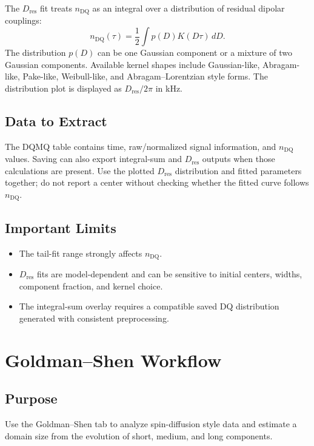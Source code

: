 \documentclass[11pt,a4paper]{article}
\newcommand{\Dres}{\ensuremath{D_{\mathrm{res}}}}
\newcommand{\nDQ}{\ensuremath{n_{\mathrm{DQ}}}}
\begin{document}
The \Dres{} fit treats \nDQ{} as an integral over a distribution of residual dipolar couplings:
\begin{equation}
\nDQ(\tau)=\frac{1}{2}\int p(D)K(D\tau)\,dD.
\end{equation}
The distribution \(p(D)\) can be one Gaussian component or a mixture of two Gaussian components. Available kernel shapes include Gaussian-like, Abragam-like, Pake-like, Weibull-like, and Abragam--Lorentzian style forms. The distribution plot is displayed as \(\Dres/2\pi\) in kHz.

\subsection{Data to Extract}
The DQMQ table contains time, raw/normalized signal information, and \nDQ{} values. Saving can also export integral-sum and \Dres{} outputs when those calculations are present. Use the plotted \Dres{} distribution and fitted parameters together; do not report a center without checking whether the fitted curve follows \nDQ{}.

\subsection{Important Limits}
\begin{itemize}
  \item The tail-fit range strongly affects \nDQ{}.
  \item \Dres{} fits are model-dependent and can be sensitive to initial centers, widths, component fraction, and kernel choice.
  \item The integral-sum overlay requires a compatible saved DQ distribution generated with consistent preprocessing.
\end{itemize}

\section{Goldman--Shen Workflow}

\subsection{Purpose}
Use the Goldman--Shen tab to analyze spin-diffusion style data and estimate a domain size from the evolution of short, medium, and long components.
\end{document}
